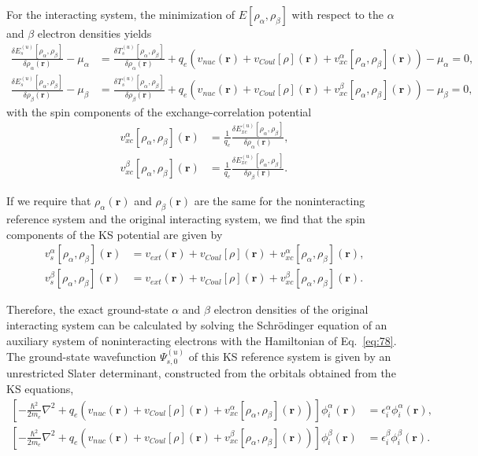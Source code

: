 \documentclass[%
 preprint, linenumbers,
 amsmath,amssymb,
 aps, physrev,
]{revtex4-2}
\begin{document}
For the interacting system, the minimization of $E[\rho_{\alpha},\rho_{\beta}]$ with respect to the $\alpha$ and $\beta$ electron densities yields
\begin{align}
    \frac{\delta E_s^{(u)}[\rho_{\alpha},\rho_{\beta}]}{\delta\rho_{\alpha}(\mathbf{r})} - \mu_{\alpha} &= \frac{\delta T_s^{(u)}[\rho_{\alpha},\rho_{\beta}]}{\delta\rho_{\alpha}(\mathbf{r})} + q_e(v_{nuc}(\mathbf{r}) + v_{Coul}[\rho](\mathbf{r}) + v_{xc}^{\alpha}[\rho_{\alpha},\rho_{\beta}](\mathbf{r})) - \mu_{\alpha} = 0, \\
    \frac{\delta E_s^{(u)}[\rho_{\alpha},\rho_{\beta}]}{\delta\rho_{\beta}(\mathbf{r})} - \mu_{\beta} &= \frac{\delta T_s^{(u)}[\rho_{\alpha},\rho_{\beta}]}{\delta\rho_{\beta}(\mathbf{r})} + q_e(v_{nuc}(\mathbf{r}) + v_{Coul}[\rho](\mathbf{r}) + v_{xc}^{\beta}[\rho_{\alpha},\rho_{\beta}](\mathbf{r})) - \mu_{\beta} = 0,
\end{align}
with the spin components of the exchange-correlation potential
\begin{align}
    v_{xc}^{\alpha}[\rho_{\alpha},\rho_{\beta}](\mathbf{r}) &= \frac{1}{q_e} \frac{\delta E_{xc}^{(u)}[\rho_{\alpha},\rho_{\beta}]}{\delta\rho_{\alpha}(\mathbf{r})}, \\
    v_{xc}^{\beta}[\rho_{\alpha},\rho_{\beta}](\mathbf{r}) &= \frac{1}{q_e} \frac{\delta E_{xc}^{(u)}[\rho_{\alpha},\rho_{\beta}]}{\delta\rho_{\beta}(\mathbf{r})}.
\end{align}

If we require that $\rho_{\alpha}(\mathbf{r})$ and $\rho_{\beta}(\mathbf{r})$ are the same for the noninteracting reference system and the original interacting system, we find that the spin components of the KS potential are given by
\begin{align}
    v_s^{\alpha}[\rho_{\alpha},\rho_{\beta}](\mathbf{r}) &= v_{ext}(\mathbf{r}) + v_{Coul}[\rho](\mathbf{r}) + v_{xc}^{\alpha}[\rho_{\alpha},\rho_{\beta}](\mathbf{r}), \\
    v_s^{\beta}[\rho_{\alpha},\rho_{\beta}](\mathbf{r}) &= v_{ext}(\mathbf{r}) + v_{Coul}[\rho](\mathbf{r}) + v_{xc}^{\beta}[\rho_{\alpha},\rho_{\beta}](\mathbf{r}).
\end{align}

Therefore, the exact ground-state $\alpha$ and $\beta$ electron densities of the original interacting system can be calculated by solving the Schrödinger equation of an auxiliary system of noninteracting electrons with the Hamiltonian of Eq.~\eqref{eq:78}. The ground-state wavefunction $\Psi_{s,0}^{(u)}$ of this KS reference system is given by an unrestricted Slater determinant, constructed from the orbitals obtained from the KS equations,
\begin{align}
    \left[ -\frac{\hbar^2}{2m_e}\nabla^2 + q_e(v_{nuc}(\mathbf{r}) + v_{Coul}[\rho](\mathbf{r}) + v_{xc}^{\alpha}[\rho_{\alpha},\rho_{\beta}](\mathbf{r})) \right]\phi_i^{\alpha}(\mathbf{r}) &= \epsilon_i^{\alpha}\phi_i^{\alpha}(\mathbf{r}), \\
    \left[ -\frac{\hbar^2}{2m_e}\nabla^2 + q_e(v_{nuc}(\mathbf{r}) + v_{Coul}[\rho](\mathbf{r}) + v_{xc}^{\beta}[\rho_{\alpha},\rho_{\beta}](\mathbf{r})) \right]\phi_i^{\beta}(\mathbf{r}) &= \epsilon_i^{\beta}\phi_i^{\beta}(\mathbf{r}).
\end{align}
\end{document}

